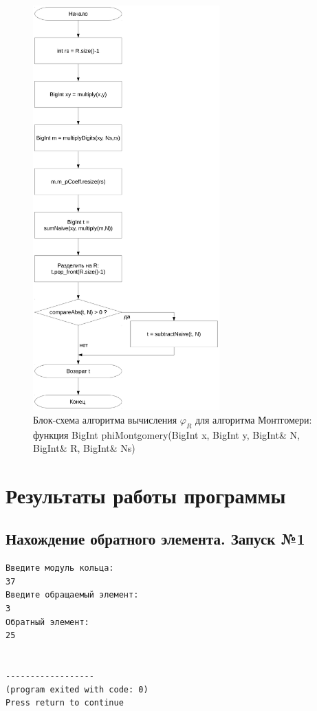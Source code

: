 \documentclass[a4paper,12pt]{article} %
\begin{document}
\begin{figure}[ht]
	\centering
	\includegraphics[width=0.64\textwidth]{lr5_phiMontgomery.pdf}
	\caption{
		Блок-схема алгоритма вычисления $\varphi_R$ для алгоритма Монтгомери:
		функция BigInt phiMontgomery(BigInt x, BigInt y, BigInt\& N, BigInt\& R, BigInt\& Ns)
	}
	\label{bs_lr5_phiMontgomery}
\end{figure}


\clearpage

\section*{Результаты работы программы}

\subsection*{Нахождение обратного элемента. Запуск №1}
\begin{verbatim}
Введите модуль кольца:
37
Введите обращаемый элемент:
3
Обратный элемент:
25


------------------
(program exited with code: 0)
Press return to continue
\end{verbatim}
\end{document}
